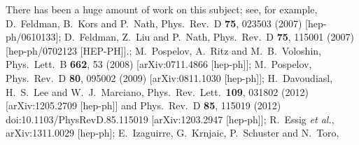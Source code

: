 \documentclass[14pt]{article}
\begin{document}
{\begin{thebibliography}{99}
 There has been a huge amount of work on this subject; see, for example, 
  D.~Feldman, B.~Kors and P.~Nath,
  Phys.\ Rev.\ D {\bf 75}, 023503 (2007)
  [hep-ph/0610133];
  D.~Feldman, Z.~Liu and P.~Nath,
  Phys.\ Rev.\ D {\bf 75}, 115001 (2007)
  [hep-ph/0702123 [HEP-PH]].;
  M.~Pospelov, A.~Ritz and M.~B.~Voloshin,
  Phys.\ Lett.\ B {\bf 662}, 53 (2008)
  [arXiv:0711.4866 [hep-ph]];
  M.~Pospelov,
  Phys.\ Rev.\ D {\bf 80}, 095002 (2009)
  [arXiv:0811.1030 [hep-ph]]; 
  H.~Davoudiasl, H.~S.~Lee and W.~J.~Marciano,
  Phys.\ Rev.\ Lett.\  {\bf 109}, 031802 (2012)
  [arXiv:1205.2709 [hep-ph]] and 
  Phys.\ Rev.\ D {\bf 85}, 115019 (2012)
  doi:10.1103/PhysRevD.85.115019
  [arXiv:1203.2947 [hep-ph]];
  R.~Essig {\it et al.},
  arXiv:1311.0029 [hep-ph];
  E.~Izaguirre, G.~Krnjaic, P.~Schuster and N.~Toro,

\end{thebibliography}}
\end{document}
